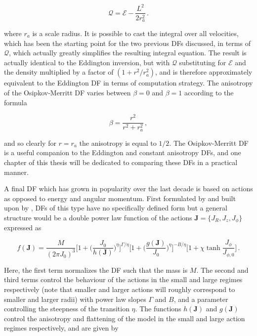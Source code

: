 \begin{equation}
    \label{ch1:eq:osipkov-merritt-pseudo-energy}
    \mathcal{Q} = \mathcal{E} - \frac{L^{2}}{2r_{a}^{2}}\,.
\end{equation}

\noindent where $r_{a}$ is a scale radius. It is possible to cast the integral over all velocities, which has been the starting point for the two previous DFs discussed, in terms of $\mathcal{Q}$, which actually greatly simplifies the resulting integral equation. The result is actually identical to the Eddington inversion, but with $\mathcal{Q}$ substituting for $\mathcal{E}$ and the density multiplied by a factor of $(1 + r^{2}/r_{a}^{2})$, and is therefore approximately equivalent to the Eddington DF in terms of computation strategy. The anisotropy of the Osipkov-Merritt DF varies between $\beta=0$ and $\beta=1$ according to the formula

\begin{equation}
    \label{ch1:eq:osipkov-merritt-anisotropy}
    \beta = \frac{r^{2}}{r^{2} + r_{a}^{2}}\,,
\end{equation}

and so clearly for $r=r_{a}$ the anisotropy is equal to $1/2$. The Osipkov-Merritt DF is a useful companion to the Eddington and constant anisotropy DFs, and one chapter of this thesis will be dedicated to comparing these DFs in a practical manner.

A final DF which has grown in popularity over the last decade is based on actions as opposed to energy and angular momentum. First formulated by \textcite{binney14d} and built upon by \textcite{posti15}, DFs of this type have no specifically defined form but a general structure would be a double power law function of the actions $\mathbf{J} = \{ J_{R}, J_{z}, J_{\phi} \}$ expressed as

\begin{equation}
    \label{ch1:eq:action-df}
    f(\mathbf{J}) = \frac{M}{(2\pi J_{0})^{3}} 
    \bigg[ 1 + \bigg( \frac{J_{0}}{h(\mathbf{J})} \bigg)^{\eta} \bigg]^{\Gamma/\eta} 
    \bigg[ 1 + \bigg( \frac{g(\mathbf{J})}{J_{0}} \bigg)^{\eta} \bigg]^{-B/\eta}
    \bigg[ 1 + \chi \tanh \frac{J_{\phi}}{J_{\phi,0}} \bigg]
    \,.
\end{equation}

\noindent Here, the first term normalizes the DF such that the mass is $M$. The second and third terms control the behaviour of the actions in the small and large regimes respectively (note that smaller and larger actions will roughly correspond to smaller and larger radii) with power law slopes $\Gamma$ and $B$, and a parameter controlling the steepness of the transition $\eta$. The functions $h(\mathbf{J})$ and $g(\mathbf{J})$ control the anisotropy and flattening of the model in the small and large action regimes respectively, and are given by 

